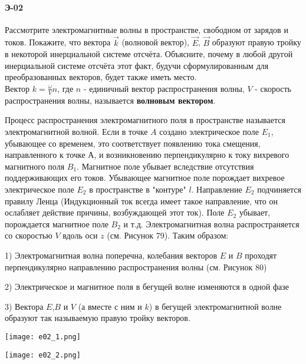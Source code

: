 \documentclass[__main__.tex]{subfiles}
\begin{document}
\paragraph{Э-02}
Рассмотрите электромагнитные волны в пространстве, свободном от зарядов и токов. Покажите, что вектора $\vec{k}$ (волновой вектор), $\vec{E}$, $\vec{B}$ образуют правую тройку в некоторой инерциальной системе отсчёта. Объясните, почему в любой другой инерциальной системе отсчёта этот факт, будучи сформулированным для преобразованных векторов, будет также иметь место.\\

Вектор $k = \frac{\omega}{V} n$, где $n$ - единичный вектор распространения волны, $V$ - скорость распространения волны, называется \textbf{волновым вектором}.

Процесс распространения электромагнитного поля в пространстве называется электромагнитной волной. Если в точке $A$ создано электрическое поле $E_1$, убывающее со временем, это соответствует появлению тока смещения, направленного к точке А, и возникновению перпендикулярно к току вихревого магнитного поля $B_1$. Магнитное поле убывает вследствие отсутствия поддерживающих его токов. Убывающее магнитное поле порождает вихревое электрическое поле $E_2$ в пространстве в "контуре" $l$. Направление $E_2$ подчиняется правилу Ленца (Индукционный ток всегда имеет такое направление, что он ослабляет действие причины, возбуждающей этот ток). Поле $E_2$ убывает, порождается магнитное поле $B_2$ и т.д. Электромагнитная волна распространяется со скоростью $V$ вдоль оси $z$ (см. Рисунок 79). Таким образом:

1) Электромагнитная волна поперечна, колебания векторов $E$ и $B$ проходят перпендикулярно направлению распространения волны (см. Рисунок 80)

2) Электрическое и магнитное поля в бегущей волне изменяются в одной фазе

3) Вектора $E$,$B$ и $V$ (а вместе с ним и $k$) в бегущей электромагнитной волне образуют так называемую правую тройку векторов.

\begin{center}
	\texttt{[image: e02\_1.png]}
\end{center}

\begin{center}
	\texttt{[image: e02\_2.png]}
\end{center}
\end{document}
